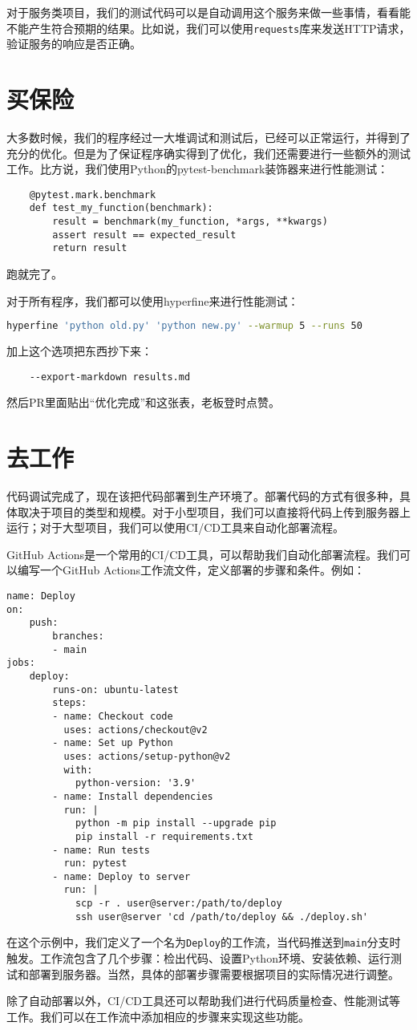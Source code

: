 对于服务类项目，我们的测试代码可以是自动调用这个服务来做一些事情，看看能不能产生符合预期的结果。比如说，我们可以使用\texttt{requests}库来发送HTTP请求，验证服务的响应是否正确。

\section{买保险}

大多数时候，我们的程序经过一大堆调试和测试后，已经可以正常运行，并得到了充分的优化。但是为了保证程序确实得到了优化，我们还需要进行一些额外的测试工作。比方说，我们使用Python的pytest-benchmark装饰器来进行性能测试：
\begin{lstlisting}
    @pytest.mark.benchmark
    def test_my_function(benchmark):
        result = benchmark(my_function, *args, **kwargs)
        assert result == expected_result
        return result
\end{lstlisting}
跑就完了。

对于所有程序，我们都可以使用hyperfine来进行性能测试：
\begin{lstlisting}[language=bash]
    hyperfine 'python old.py' 'python new.py' --warmup 5 --runs 50
\end{lstlisting}
加上这个选项把东西抄下来：
\begin{lstlisting}
    --export-markdown results.md
\end{lstlisting}
然后PR里面贴出“优化完成”和这张表，老板登时点赞。

\section{去工作}

代码调试完成了，现在该把代码部署到生产环境了。部署代码的方式有很多种，具体取决于项目的类型和规模。对于小型项目，我们可以直接将代码上传到服务器上运行；对于大型项目，我们可以使用CI/CD工具来自动化部署流程。

GitHub Actions是一个常用的CI/CD工具，可以帮助我们自动化部署流程。我们可以编写一个GitHub Actions工作流文件，定义部署的步骤和条件。例如：
\begin{lstlisting}
name: Deploy
on:
    push:
        branches:
        - main
jobs:
    deploy:
        runs-on: ubuntu-latest
        steps:
        - name: Checkout code
          uses: actions/checkout@v2
        - name: Set up Python
          uses: actions/setup-python@v2
          with:
            python-version: '3.9'
        - name: Install dependencies
          run: |
            python -m pip install --upgrade pip
            pip install -r requirements.txt
        - name: Run tests
          run: pytest
        - name: Deploy to server
          run: |
            scp -r . user@server:/path/to/deploy
            ssh user@server 'cd /path/to/deploy && ./deploy.sh'
\end{lstlisting}
在这个示例中，我们定义了一个名为\texttt{Deploy}的工作流，当代码推送到\texttt{main}分支时触发。工作流包含了几个步骤：检出代码、设置Python环境、安装依赖、运行测试和部署到服务器。当然，具体的部署步骤需要根据项目的实际情况进行调整。

除了自动部署以外，CI/CD工具还可以帮助我们进行代码质量检查、性能测试等工作。我们可以在工作流中添加相应的步骤来实现这些功能。

